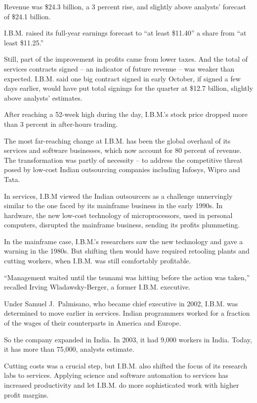 ﻿\documentclass[12pt]{article}
\begin{document}
Revenue was \$24.3 billion, a 3 percent rise, and slightly above analysts' forecast of \$24.1
billion.

I.B.M. raised its full-year earnings forecast to ``at least \$11.40'' a share from ``at least
\$11.25.''

Still, part of the improvement in profits came from lower taxes. And the total of services contracts
signed -- an indicator of future revenue -- was weaker than expected. I.B.M. said one big contract
signed in early October, if signed a few days earlier, would have put total signings for the quarter
at \$12.7 billion, slightly above analysts' estimates.

After reaching a 52-week high during the day, I.B.M.'s stock price dropped more than 3 percent in
after-hours trading.

The most far-reaching change at I.B.M. has been the global overhaul of its services and software
businesses, which now account for 80 percent of revenue. The transformation was partly of necessity
-- to address the competitive threat posed by low-cost Indian outsourcing companies including
Infosys, Wipro and Tata.

In services, I.B.M viewed the Indian outsourcers as a challenge unnervingly similar to the one faced
by its mainframe business in the early 1990s. In hardware, the new low-cost technology of
microprocessors, used in personal computers, disrupted the mainframe business, sending its profits
plummeting.

In the mainframe case, I.B.M.'s researchers saw the new technology and gave a warning in the 1980s.
But shifting then would have required retooling plants and cutting workers, when I.B.M. was still
comfortably profitable.

``Management waited until the tsunami was hitting before the action was taken,'' recalled Irving
Wladawsky-Berger, a former I.B.M. executive.

Under Samuel J.~Palmisano, who became chief executive in 2002, I.B.M. was determined to move earlier
in services. Indian programmers worked for a fraction of the wages of their counterparts in America
and Europe.

So the company expanded in India. In 2003, it had 9,000 workers in India. Today, it has more than
75,000, analysts estimate.

Cutting costs was a crucial step, but I.B.M. also shifted the focus of its research labs to
services. Applying science and software automation to services has increased productivity and let
I.B.M. do more sophisticated work with higher profit margins.
\end{document}

